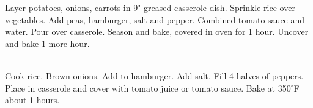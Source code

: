 \begin{minipage}{\linewidth}
\end{minipage}\par\begin{minipage}{\linewidth} 
{Layer potatoes, onions, carrots in 9" greased casserole dish. Sprinkle rice over vegetables. Add peas, hamburger, salt and pepper. Combined tomato sauce and water. Pour over casserole. Season and bake, covered in oven for 1 hour. Uncover and bake 1 more hour.}

\end{minipage}\par\begin{minipage}{\linewidth} 
\\
{Cook rice. Brown onions. Add to hamburger. Add salt. Fill 4 halves of peppers. Place in casserole and cover with tomato juice or tomato sauce. Bake at 350$^\circ$F about 1  hours.}


\end{minipage}
